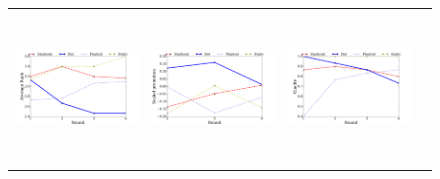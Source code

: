 \newcommand{\figWidth}{4.25cm}
\newcommand{\figHeight}{4cm}
\begin{figure}[t]
\hspace*{-0.5cm}
  \begin{tabular}{cccc}
\includegraphics[width=\figWidth, height=\figHeight]{Results/average.pdf} &
\hspace*{-.5cm}        {\includegraphics[width=\figWidth, height=\figHeight]{Results/potential}} &
 \includegraphics[width=\figWidth, height=\figHeight]{Results/ks} & 

\end{tabular}
\end{figure}
